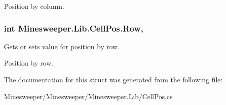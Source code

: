 Position by column.\hypertarget{struct_minesweeper_1_1_lib_1_1_cell_pos_adb4d01bbbda584e580a188aa48173834}{
\subsubsection[{Row}]{\setlength{\rightskip}{0pt plus 5cm}int Minesweeper.\+Lib.\+Cell\+Pos.\+Row\hspace{0.3cm}{\ttfamily [get]}, {\ttfamily [set]}}}\label{struct_minesweeper_1_1_lib_1_1_cell_pos_adb4d01bbbda584e580a188aa48173834}


Gets or sets value for position by row. 

Position by row.

The documentation for this struct was generated from the following file\+:\begin{DoxyCompactItemize}
\item 
Minesweeper/\+Minesweeper/\+Minesweeper.\+Lib/Cell\+Pos.\+cs\end{DoxyCompactItemize}
